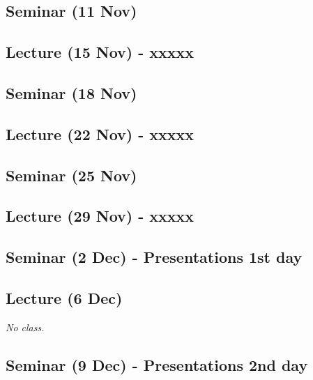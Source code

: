\documentclass[12pt, a4paper]{article}
\begin{document}
\subsection*{Seminar (11 Nov)}

\subsection*{Lecture (15 Nov) - xxxxx}

\subsection*{Seminar (18 Nov)}

\subsection*{Lecture (22 Nov) - xxxxx}

\subsection*{Seminar (25 Nov)}

\subsection*{Lecture (29 Nov) - xxxxx}

\subsection*{Seminar (2 Dec) - Presentations 1st day}

\subsection*{Lecture (6 Dec) {\color{red}{(No class)}}}

\textit{No class.}

\subsection*{Seminar (9 Dec) - Presentations 2nd day}
\end{document}
